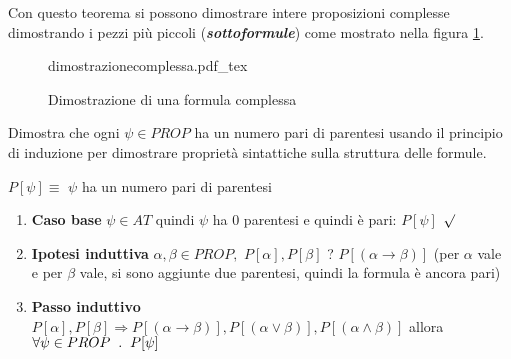\documentclass{article}
\newcommand{\incfig}[2][1]{%
	\def\svgwidth{#1\columnwidth}
	{#2.pdf_tex}
}
\theoremstyle{break}
\theoremstyle{break}
\theoremstyle{break}
\theoremstyle{break}
\begin{document}
Con questo teorema si possono dimostrare intere proposizioni complesse dimostrando i pezzi
più piccoli (\textbf{\emph{sottoformule}}) come mostrato nella figura \ref{fig:dimostrazionecomplessa}.

\label{ex:dimostrazioneComplessa}
\begin{figure}[ht]
	\centering
	\incfig[1]{dimostrazionecomplessa}
	\caption{Dimostrazione di una formula complessa}
	\label{fig:dimostrazionecomplessa}
\end{figure}

\pagebreak

\begin{exercise}
	\label{ex:parentesiPari}
	Dimostra che ogni \( \psi \in PROP \) ha un numero pari di parentesi usando
	il principio di induzione per dimostrare proprietà sintattiche sulla struttura
	delle formule.

	\( P[\psi] \equiv \) \( \psi \) ha un numero pari di parentesi
	\begin{enumerate}
		\item \textbf{Caso base} \( \psi \in AT \) quindi \( \psi \) ha 0 parentesi
		      e quindi è pari: \( P[\psi] \) \( \surd \)
		\item \textbf{Ipotesi induttiva} \( \alpha , \beta \in PROP, \) \( P[\alpha ], P[\beta ] \)
		      ? \( P[(\alpha \to \beta )] \) (per \( \alpha  \) vale e per \( \beta  \) vale, si sono
		      aggiunte due parentesi, quindi la formula è ancora pari)
		\item \textbf{Passo induttivo} \( P[\alpha], P[\beta] \Rightarrow P[(\alpha \to \beta )], P[(\alpha \vee \beta )],
		      P[(\alpha \wedge \beta)]\) allora \( \forall \psi \in PROP \hspace{2mm}.\hspace{2mm} P[\psi] \)

	\end{enumerate}
\end{exercise}
\end{document}
